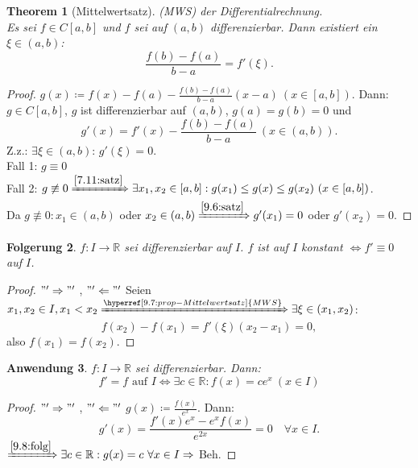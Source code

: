 \documentclass[14pt,titlepage,ngerman,a4paper,headsepline,DIV15,halfparskip*]{scrartcl}
\newcommand{\R}{\mathbb{R}}
\theoremstyle{named}
\newtheorem{namedtheorem}{Theorem} \counterwithin{namedtheorem}{section}
\theoremstyle{dotless}
\newtheorem{folg}[namedtheorem]{Folgerung}
\newtheorem{anwendung}[namedtheorem]{Anwendung}
\begin{document}
\begin{namedtheorem}[Mittelwertsatz] \label{9.7:prop-Mittelwertsatz}
	(MWS) der Differentialrechnung. \\
	Es sei $f \in C[a, b]$ und $f$ sei auf $(a, b)$ differenzierbar. Dann existiert ein $\xi \in (a, b)$:
	$$ \frac{f(b) - f(a)}{b - a} = f'(\xi). $$
\end{namedtheorem}

\begin{proof}
	$g(x) \coloneqq f(x) - f(a) - \frac{f(b) - f(a)}{b - a} (x - a) ~(x \in [a, b])$. Dann: $g \in C[a, b]$, $g$ ist differenzierbar auf $(a, b)$, $g(a) = g(b) = 0$ und 
		$$ g'(x) = f'(x) - \frac{f(b) - f(a)}{b - a} ~(x \in (a, b)). $$
	Z.z.: $\exists \xi \in (a, b)$: $g'(\xi) = 0$. \\
	Fall 1: $g \equiv 0$ \checkmark \\
	Fall 2: $g \not\equiv 0 \xRightarrow[]{\ref{7.11:satz}} \exists x_{1}, x_{2} \in [a, b]: g(x_{1}) \leq g(x) \leq g(x_{2}) ~(x \in [a, b])$. \\
	Da $g \not\equiv 0: x_{1} \in (a, b)$ oder $x_{2} \in (a, b) \xRightarrow[]{\ref{9.6:satz}} g'(x_{1}) = 0$ oder $g'(x_{2}) = 0$.
\end{proof}


\begin{folg} \label{9.8:folg}
	$f \colon I \rightarrow \R$ sei differenzierbar auf $I$. $f$ ist auf $I$ konstant $\iff f' \equiv 0$ auf $I$.	
\end{folg}

\begin{proof}
	$"'\Rightarrow"'$ \checkmark, $"'\Leftarrow"'$ Seien $x_{1}, x_{2} \in I, x_{1} < x_{2} \xRightarrow[]{\hyperref[9.7:prop-Mittelwertsatz]{MWS}} \exists \xi \in (x_{1}, x_{2})$: 
		$$ f(x_{2}) - f(x_{1}) = f'(\xi) (x_{2} - x_{1}) = 0, $$ 
	also $f(x_{1}) = f(x_{2})$.
\end{proof}


\begin{anwendung} \label{9.9:anwendung}
	$f \colon I \rightarrow \R$ sei differenzierbar. Dann: 
		$$ f' = f \text{ auf } I \iff \exists c \in \R: f(x) = c e^{x} ~(x \in I) $$
\end{anwendung}

\begin{proof}
	$"'\Rightarrow"'$ \checkmark, $"'\Leftarrow"'$ $g(x) \coloneqq \frac{f(x)}{e^{x}}$. Dann:
	$$ g'(x) = \frac{f'(x) e^{x} - e^{x} f(x)}{e^{2x}} = 0 \quad \forall x \in I. $$
	$\xRightarrow[]{\ref{9.8:folg}} \exists c \in \R: g(x) = c ~\forall x \in I \Rightarrow$ Beh.
\end{proof}
\end{document}
